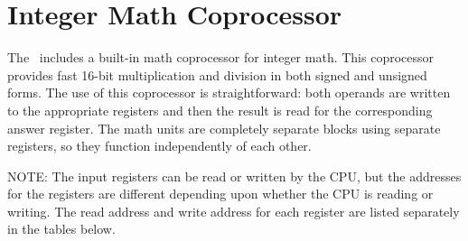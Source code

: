 \chapter{Integer Math Coprocessor}
\label{sec:int_math_copro}

The \jr\ includes a built-in math coprocessor for integer math. This coprocessor provides fast 16-bit multiplication and division in both signed and unsigned forms. The use of this coprocessor is straightforward: both operands are written to the appropriate registers and then the result is read for the corresponding answer register. The math units are completely separate blocks using separate registers, so they function independently of each other.

NOTE: The input registers can be read or written by the CPU, but the addresses for the registers are different depending upon whether the CPU is reading or writing. The read address and write address for each register are listed separately in the tables below.

